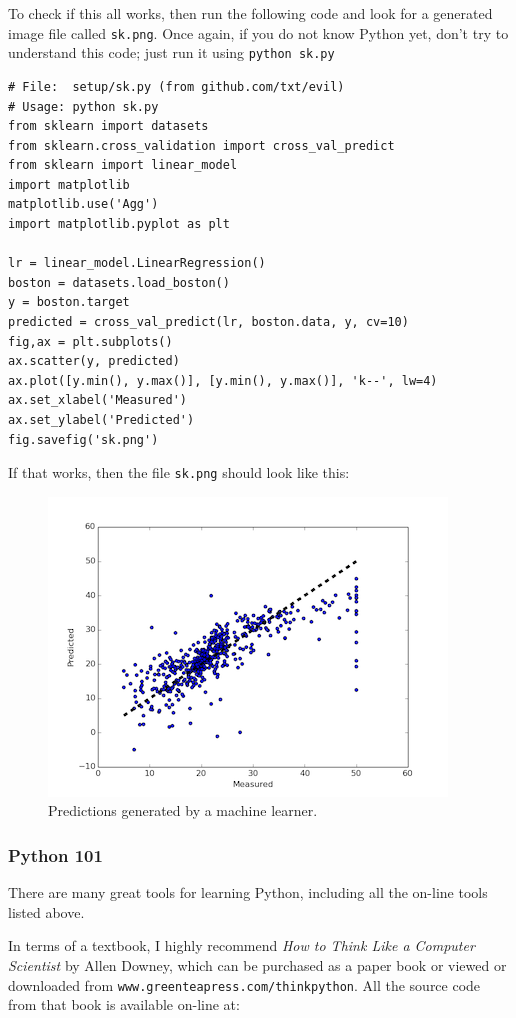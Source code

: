 To check if this all works, then run the following code and look for a
generated image file called \texttt{sk.png}. Once again, if you do not
know Python yet, don't try to understand this code; just run it using
\texttt{python\ sk.py}

\begin{lstlisting}
# File:  setup/sk.py (from github.com/txt/evil)
# Usage: python sk.py
from sklearn import datasets
from sklearn.cross_validation import cross_val_predict
from sklearn import linear_model
import matplotlib
matplotlib.use('Agg')
import matplotlib.pyplot as plt

lr = linear_model.LinearRegression()
boston = datasets.load_boston()
y = boston.target
predicted = cross_val_predict(lr, boston.data, y, cv=10)
fig,ax = plt.subplots()
ax.scatter(y, predicted)
ax.plot([y.min(), y.max()], [y.min(), y.max()], 'k--', lw=4)
ax.set_xlabel('Measured')
ax.set_ylabel('Predicted')
fig.savefig('sk.png')
\end{lstlisting}

If that works, then the file \texttt{sk.png} should look like this:

\begin{figure}[htbp]
\centering
\includegraphics{img/sk.png}
\caption{Predictions generated by a machine learner.}
\end{figure}

\subsubsection{Python 101}\label{python-101}

There are many great tools for learning Python, including all the
on-line tools listed above.

In terms of a textbook, I highly recommend \emph{How to Think Like a
Computer Scientist} by Allen Downey, which can be purchased as a paper
book or viewed or downloaded from
\texttt{www.greenteapress.com/thinkpython}. All the source code from
that book is available on-line at:

